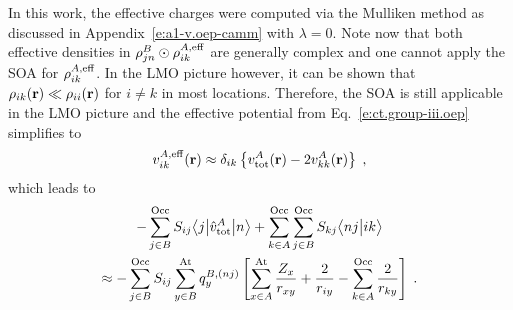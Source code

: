 %
In this work, the effective charges were computed via the Mulliken method as
discussed in Appendix~\ref{e:a1-v.oep-camm} with $\lambda=0$. 
Note now that both effective densities in 
$\rho^B_{jn} \odot \rho^{A,{\rm eff}}_{ik}$ are generally complex and one cannot apply the SOA
for $\rho^{A,{\rm eff}}_{ik}$. In the LMO picture however, it can be shown that
$\rho_{ik} ({\bf r}) \ll \rho_{ii} ({\bf r})$ 
for $i\ne k$ in most locations. Therefore,
the SOA is still applicable in the LMO picture
and the effective potential from Eq.~\eqref{e:ct.group-iii.oep} 
simplifies to
%
\begin{equation} \label{e:ct.group-iii.oep.simplified}
 {v}^{A,{\rm eff}}_{ik}({\bf r}) \approx
 \delta_{ik} \left\{
 {v}^A_{\rm tot} ({\bf r})- 2{v}^A_{kk} ({\bf r}) \right\} \;,
\end{equation}
%
which
leads to 
%
\begin{multline} \label{e:ct.group-iii.final.b}
        - \sum_{j\in B}^{\rm Occ} S_{ij} \bigl\langle {j} \bigl\lvert {\hat{v}^A_{\rm tot} } \bigl\lvert {n} \bigr\rangle  
     + \sum_{k\in A}^{\rm Occ} \sum_{j\in B}^{\rm Occ}  
        S_{kj}
        \bigl\langle {nj} \bigl\lvert {ik} \bigr\rangle  \\
 \approx  -
 \sum_{j\in B}^{\rm Occ} S_{ij}
 \sum_{y\in B}^{\rm At} 
 q^{B,(nj)}_{y} 
 \left[ 
   \sum_{x\in A}^{\rm At}
   \frac{Z_x}{r_{xy}}
  + \frac{2}{r_{iy}}
  - \sum_{k\in A}^{\rm Occ}
    \frac{2}{r_{ky}} 
 \right]
 \;.
\end{multline}
%


